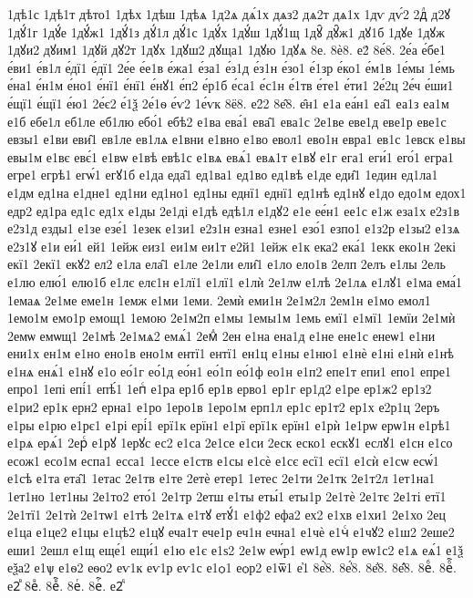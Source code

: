 {1дѣ1с
1дѣ1т
дѣто1
1дѣх
1дѣш
1дѣѧ
1д2ѧ
дѧ́1х
дѧз2
дѧ2т
дѧ1х
1дѵ
дѵ́2
2дⷧ
д2ꙋ
1дꙋ́1г
1дꙋ́е
1дꙋ́ж1
1дꙋ́1з
дꙋ́1л
дꙋ́1с
1дꙋ́х
1дꙋ́ш
1дꙋ́1щ
1дꙋ̑
дꙋ̑ж1
дꙋ1б
1дꙋе
1дꙋж
1дꙋи2
дꙋим1
1дꙋй
дꙋ2т
1дꙋх
1дꙋш2
дꙋща1
1дꙋю
1дꙋѧ
8е.
8ѐ8.
е2́
8е́8.
2е́а
е́бе1
е́ви1
е́в1л
е́дї1
е́дї1
2е́е
е́е1в
е́жа1
е́за1
е́з1д
е́з1н
е́зо1
е́1зр
е́ко1
е́м1в
1е́мы
1е́мь
е́на1
е́н1м
е́но1
е́нї1
е́нї1
е́нꙋ1
е́п2
е́р1б
е́са1
е́с1н
е́1тв
е́те1
е́ти1
2е́2ц
2е́ч
е́ши1
е́щї1
е́щї1
е́ю1
2е́є2
е́1ѯ
2е́1ѳ
е́ѵ2
1е́ѵк
8ё8.
е2̑2
8е̑8.
е̑н1
е1а
еа́н1
еа̑1
еа1з
еа1м
е1б
ебе1л
еб1ле
еб1лю
ебо́1
ебѣ2
е1ва
ева́1
ева̑1
ева1с
2е1ве
еве1д
еве1р
еве1с
евзы1
е1ви
еви̑1
ев1ле
ев1лѧ
е1вни
е1вно
е1во
евол1
ево1н
евра1
ев1с
1евск
е1вы
евы1м
е1вє
евє́1
е1вѡ
е1вѣ
евѣ1с
е1вѧ
евѧ́1
евѧ1т
е1вꙋ
е1г
ега1
еги́1
его́1
егра1
егре1
егрѣ1
егѡ́1
егꙋ1б
е1да
еда̑1
ед1ва1
ед1во
ед1вѣ
е1де
еди̑1
1един
ед1ла1
е1дм
ед1на
е1дне1
ед1ни
ед1но1
ед1ны
еднї1
еднї1
ед1нѣ
ед1нꙋ
е1до
едо1м
едох1
едр2
ед1ра
ед1с
ед1х
е1ды
2е1ді
е1дѣ
едѣ1л
е1дꙋ2
е1е
ее́н1
ее1с
е1ж
еза1х
е2з1в
е2з1д
езды1
е1зе
езе́1
1езек
е1зи1
е2з1н
езна1
езне1
езо́1
езпо1
е1з2р
е1зы2
е1зѧ
е2з1ꙋ
е1и
еи́1
ей1
1ейж
еиз1
еи1м
еи1т
е2й1
1ейж
е1к
ека2
ека́1
1екк
еко1н
2екі
екї1
2екї1
екꙋ2
ел2
е1ла
ела̑1
е1ле
2е1ли
ели̑1
е1ло
ело1в
2елп
2елъ
е1лы
2ель
е1лю
елю́1
елю1б
е1лє
елє1н
е1лї1
е1лї1
е1лѝ
2е1лѡ
е1лѣ
2е1лѧ
е1лꙋ1
е1ма
ема́1
1емаѧ
2е1ме
еме1н
1емж
е1ми
1еми.
2емѝ
еми1н
2е1м2л
2ем1н
е1мо
емол1
1емо1м
емо1р
емощ1
1емою
2е1м2п
е1мы
1емы1м
1емь
емї1
е1мї1
1емїи
2е1мѝ
2емѡ
емѡщ1
2е1мѣ
2е1мѧ2
емѧ́1
2емⷣ
2ен
е1на
ена1д
е1не
ене1с
енеѡ1
е1ни
ени1х
ен1м
е1но
ено1в
ено1м
ентї1
ентї1
ен1ц
е1ны
е1ню1
е1нѐ
е1ні
е1нѝ
е1нѣ
е1нѧ
енѧ́1
е1нꙋ
е1о
ео́1г
ео́1д
ео́н1
ео́1п
ео́1ф
ео1н
е1п2
епе1т
епи1
епо1
епре1
епро1
1епі
епі́1
епѣ́1
1епⷭ
е1ра
ер1б
ер1в
ерво1
ер1г
ер1д2
е1ре
ер1ж2
ер1з2
е1ри2
ер1к
ерн2
ерна1
е1ро
1еро1в
1еро1м
ерп1л
ер1с
ер1т2
ер1х
е2р1ц
2еръ
е1ры
е1рю
е1рє1
е1рі
ері́1
ерї1к
ерїн1
е1рї
ерї1к
ерїн1
е1рѝ
1е1рѡ
ерѡ1н
е1рѣ1
е1рѧ
ерѧ́1
2ерⷭ
е1рꙋ
1ерꙋс
ес2
е1са
2е1се
е1си
2еск
еско1
ескꙋ1
еслꙋ1
е1сн
е1со
есож1
есо1м
еспа1
есса1
1ессе
е1ств
е1сы
е1сѐ
е1сє
есї1
есї1
е1сѝ
е1сѡ
есѡ́1
е1сѣ
е1та
ета̑1
1етас
2е1тв
е1те
2етѐ
етер1
1етес
2е1ти
2е1тк
2е1т2л
1ет1на1
1ет1но
1ет1ны
2е1то2
ето́1
2е1тр
2етш
е1ты
еты́1
еты1р
2е1тѐ
2е1тє
2е1ті
етї1
2е1тї1
2е1тѝ
2е1тѡ1
е1тѣ
2е1тѧ
е1тꙋ
етꙋ́1
е1ф2
ефа2
ех2
е1хв
е1хи1
2е1хо
2ец
е1ца
е1це2
е1цы
е1цѣ2
е1цꙋ
еча1т
ече1р
еч1н
ечна1
е1чѐ
е1чⷭ
е1чꙋ2
е1ш2
2еше2
еши1
2ешл
е1щ
еще́1
ещи́1
е1ю
е1є
е1ѕ2
2е1ѡ
еѡ́р1
еѡ1д
еѡ1р
еѡ1с2
е1ѧ
еѧ́1
е1ѯ
еѯа2
е1ѱ
е1ѳ2
еѳо2
еѵ1к
еѵ1р
еѵ1с
е1ѻ1
еѻр2
е1ѿ1
е҆1
8е҆̀8.
8е҆́8.
8е҆̈8.
8е҆̑8.
8еⷠ.
8еⷠ҇.
е2ⷡ
8еⷡ.
8еⷡ҇.
8еⷢ.
8еⷢ҇.
е2ⷣ
}
